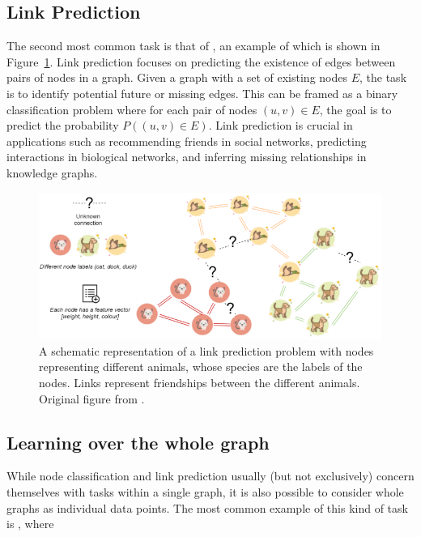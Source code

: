\subsection{Link Prediction}

The second most common task is that of , an example of which is shown in Figure~\ref{fig:link-prediction}. Link prediction focuses on predicting the existence of edges between pairs of nodes in a graph. Given a graph with a set of existing nodes \( E \), the task is to identify potential future or missing edges. This can be framed as a binary classification problem where for each pair of nodes \( (u, v) \in E \), the goal is to predict the probability \( P((u, v) \in E) \). Link prediction is crucial in applications such as recommending friends in social networks, predicting interactions in biological networks, and inferring missing relationships in knowledge graphs.  

\begin{figure}
	\includegraphics[width=\linewidth]{images/graph-tasks/link-prediction.png}
	\caption{A schematic representation of a link prediction problem with nodes representing different animals, whose species are the labels of the nodes. Links represent friendships between the different animals. Original figure from \cite{kubara_machine_2020}.}
	\label{fig:link-prediction}
\end{figure}

\subsection{Learning over the whole graph}

While node classification and link prediction usually (but not exclusively) concern themselves with tasks within a single graph, it is also possible to consider whole graphs as individual data points. The most common example of this kind of task is , where 

